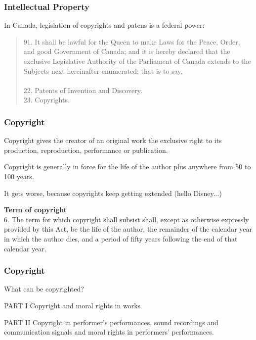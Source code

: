 \begin{frame}
\frametitle{Intellectual Property}

In Canada, legislation of copyrights and patens is a federal power:

\begin{quote}
91. It shall be lawful for the Queen to make Laws for the Peace, Order, and good Government of Canada; and it is hereby declared that the exclusive Legislative Authority of the Parliament of Canada extends to the Subjects next hereinafter enumerated; that is to say,
\\~\\

22. Patents of Invention and Discovery.\\
23.	Copyrights.
\end{quote}

\end{frame}



\begin{frame}
\frametitle{Copyright}

Copyright gives the creator of an original work the exclusive right to its production, reproduction, performance or publication.

Copyright is generally in force for the life of the author plus anywhere from 50 to 100 years.

It gets worse, because copyrights keep getting extended (hello Disney...)


\textbf{Term of copyright}\\

6. The term for which copyright shall subsist shall, except as otherwise expressly provided by this Act, be the life of the author, the remainder of the calendar year in which the author dies, and a period of fifty years following the end of that calendar year.

\end{frame}



\begin{frame}
\frametitle{Copyright}

What can be copyrighted?


	PART I	Copyright and moral rights in works.


	PART II	Copyright in performer's performances, sound recordings and communication signals and moral rights in performers' performances.


\end{frame}



